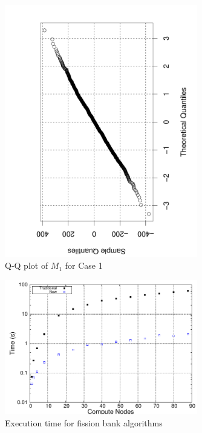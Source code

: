 \documentclass[11pt]{article}
\begin{document}
\clearpage
\begin{figure}[p]
  \centering
  \includegraphics[width=0.75\textwidth,angle=-90]{QQplot.pdf}
  \caption{Q-Q plot of $M_1$ for Case 1}
  \label{fig:QQ-plot}
\end{figure}

\clearpage
\begin{figure}[p]
  \centering
  \includegraphics[width=0.75\textwidth]{time.pdf}
  \caption{Execution time for fission bank algorithms}
  \label{fig:algorithm-time}
\end{figure}
\end{document}
